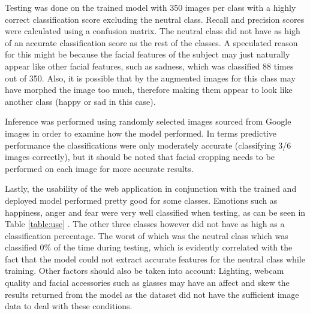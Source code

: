 Testing was done on the trained model with 350 images per class with a highly correct classification score excluding the neutral class. Recall and precision scores were calculated using a confusion matrix. The neutral class did not have as high of an accurate classification score as the rest of the classes. A speculated reason for this might be because the facial features of the subject may just naturally appear like other facial features, such as sadness, which was classified 88 times out of 350. Also, it is possible that by the augmented images for this class may have morphed the image too much, therefore making them appear to look like another class (happy or sad in this case).

Inference was performed using randomly selected images sourced from Google images in order to examine how the model performed. In terms predictive performance the classifications were only moderately accurate (classifying 3/6 images correctly), but it should be noted that facial cropping needs to be performed on each image for more accurate results.

Lastly, the usability of the web application in conjunction with the trained and deployed model performed pretty good for some classes. Emotions such as happiness, anger and fear were very well classified when testing, as can be seen in Table \ref{table:use} . The other three classes however did not have as high as a classification percentage. The worst of which was the neutral class which was classified 0\% of the time during testing, which is evidently correlated with the fact that the model could not extract accurate features for the neutral class while training. Other factors should also be taken into account: Lighting, webcam quality and facial accessories such as glasses may have an affect and skew the results returned from the model as the dataset did not have the sufficient image data to deal with these conditions.



